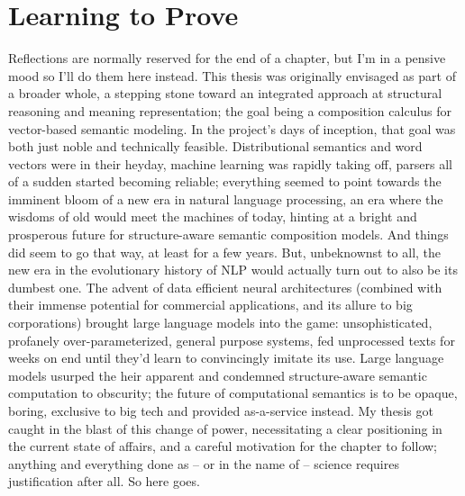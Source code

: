 \chapter{Learning to Prove}
\label{chapter:chapter_4}


\chapabstract{\todo}


Reflections are normally reserved for the end of a chapter, but I'm in a pensive mood so I'll do them here instead.
This thesis was originally envisaged as part of a broader whole, a stepping stone toward an integrated approach at structural reasoning and meaning representation; the goal being a composition calculus for vector-based semantic modeling.
In the project's days of inception, that goal was both just noble and technically feasible.
Distributional semantics and word vectors were in their heyday, machine learning was rapidly taking off, parsers all of a sudden started becoming reliable; everything seemed to point towards the imminent bloom of a new era in natural language processing, an era where the wisdoms of old would meet the machines of today, hinting at a bright and prosperous future for structure-aware semantic composition models.
And things did seem to go that way, at least for a few years.
But, unbeknownst to all, the new era in the evolutionary history of NLP would actually turn out to also be its dumbest one.
The advent of data efficient neural architectures (combined with their immense potential for commercial applications, and its allure to big corporations) brought large language models into the game: unsophisticated, profanely over-parameterized, general purpose systems, fed unprocessed texts for weeks on end until they'd learn to convincingly imitate its use.
Large language models usurped the heir apparent and condemned structure-aware semantic computation to obscurity; the future of computational semantics is to be opaque, boring, exclusive to big tech and provided as-a-service instead.
My thesis got caught in the blast of this change of power, necessitating a clear positioning in the current state of affairs, and a careful motivation for the chapter to follow; anything and everything done as -- or in the name of -- science requires justification after all.
So here goes.

